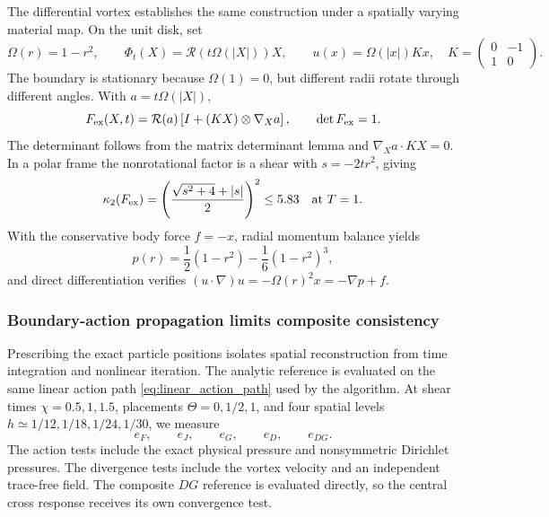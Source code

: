 \documentclass[11pt]{article}
\theoremstyle{plain}
\theoremstyle{definition}
\theoremstyle{remark}
\newcommand{\Th}{\Theta}
\begin{document}
The differential vortex establishes the same construction under a spatially
varying material map.  On the unit disk, set
\begin{equation}
 \Omega(r)=1-r^2,
 \qquad
 \Phi_t(X)=\mathcal R\!\left(t\Omega(|X|)\right)X,
 \qquad
 u(x)=\Omega(|x|)Kx,
 \quad
 K=\begin{pmatrix}0&-1\\1&0\end{pmatrix}.
 \label{eq:differential_vortex_map}
\end{equation}
The boundary is stationary because $\Omega(1)=0$, but different radii rotate
through different angles.  With $a=t\Omega(|X|)$,
\begin{equation}
 F_{\rm ex}(X,t)=\mathcal R(a)
 \left[I+(KX)\otimes\nabla_Xa\right],
 \qquad
 \det F_{\rm ex}=1.
 \label{eq:differential_vortex_F}
\end{equation}
The determinant follows from the matrix determinant lemma and
$\nabla_Xa\cdot KX=0$.  In a polar frame the nonrotational factor is a shear
with $s=-2tr^2$, giving
\begin{equation}
 \kappa_2(F_{\rm ex})
 =\left(\frac{\sqrt{s^2+4}+|s|}{2}\right)^2\le5.83
 \quad\text{at }T=1.
 \label{eq:differential_vortex_condition}
\end{equation}
With the conservative body force $f=-x$, radial momentum balance yields
\begin{equation}
  p(r)=\frac12(1-r^2)-\frac16(1-r^2)^3,
  \label{eq:differential_vortex_pressure}
\end{equation}
and direct differentiation verifies
$(u\cdot\nabla)u=-\Omega(r)^2x=-\nabla p+f$.

\subsubsection{Boundary-action propagation limits composite consistency}

Prescribing the exact particle positions isolates spatial reconstruction from
time integration and nonlinear iteration.  The analytic
reference is evaluated on the same linear action path
\eqref{eq:linear_action_path} used by the algorithm.  At shear times
$\chi=0.5,1,1.5$, placements
$\Th=0,1/2,1$, and four spatial levels
$h\simeq1/12,1/18,1/24,1/30$, we measure
\begin{equation}
  e_F,\qquad e_J,\qquad e_G,\qquad e_D,\qquad e_{DG}.
  \label{eq:test2_principal_errors}
\end{equation}
The action tests include the exact physical pressure and nonsymmetric
Dirichlet pressures.  The divergence tests include the vortex velocity and an
independent trace-free field.  The composite $DG$ reference is evaluated
directly, so the central cross response receives its own convergence test.
\end{document}
